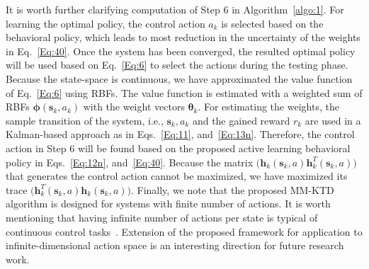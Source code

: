 \documentclass{ieeeaccess}
\def\k{_{k}}
\def\h{\bm{h}}
\def\s{\bm{s}}
\begin{document}
It is worth further clarifying computation of Step 6 in Algorithm~\ref{algo:1}. For learning the optimal policy, the control action $a_k$ is selected based on the behavioral policy, which leads to most reduction in the uncertainty of the weights in Eq.~\eqref{Eq:40}. Once the system has been converged, the resulted optimal policy will be used based on Eq.~\eqref{Eq:6} to  select the actions during the testing phase. Because the state-space is continuous, we have approximated the value function of Eq.~\eqref{Eq:6} using RBFs. The value function is estimated with a weighted sum of RBFs $\bm{\phi}(\s\k,a\k)$ with the weight vectors $\bm{\theta}\k$. For estimating the weights, the sample transition of the system, i.e., $\s\k, a\k$ and the gained reward $r\k$ are used in a Kalman-based approach as in Eqs.~\eqref{Eq:11}, and~\eqref{Eq:13n}. Therefore, the control action in Step 6 will be found based on the proposed active learning behavioral policy in Eqs.~\eqref{Eq:12n}, and~\eqref{Eq:40}. Because the matrix $\big(\h\k (\s\k,a)\h\k^T(\s\k, a)\big)$ that generates the control action cannot be maximized, we have maximized its trace $\big(\h\k^T (\s\k,a)\h\k(\s\k, a)\big)$. Finally, we note that the proposed MM-KTD algorithm is designed for systems with finite number of actions. It is worth mentioning that having infinite number of actions per state is typical of continuous control tasks~\cite{Li, Al-Tamimi:2007}. Extension of the proposed framework for application to infinite-dimensional action space is an interesting direction for future research work.
\end{document}
